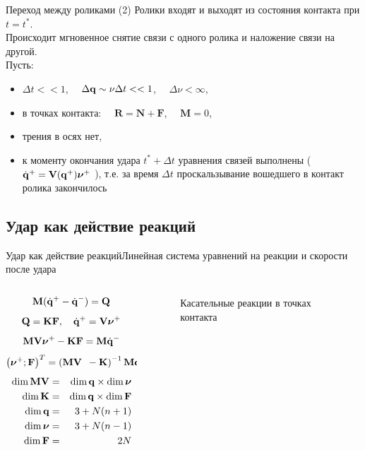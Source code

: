 \documentclass{beamer}
\begin{document}
\begin{frame}{Переход между роликами}
    \textcolor{Periwinkle}{(2) Ролики входят и выходят из состояния контакта при $t = t^*$.}\\
    Происходит мгновенное  снятие связи с одного ролика и наложение связи на другой.\\
    Пусть:
    \begin{itemize}
        \item $\Delta t << 1$, $\quad \Delta \mathbf{q} \sim \nu\Delta t << 1$, $\quad \Delta \nu < \infty$,
        \item в точках контакта: $\quad \mathbf{R} = \mathbf{N} + \mathbf{F}$, $\quad \mathbf{M} = 0 $,
        \item трения в осях нет,
        \item к моменту окончания удара $t^*+\Delta t$ уравнения связей выполнены (\enspace $\dot{\mathbf{q}}^+ = \mathbf{V}(\mathbf{q}^+)\boldsymbol{\mathbf{\nu}}^+ \ $), т.е. за время $\Delta t$ проскальзывание вошедшего в контакт ролика закончилось
    \end{itemize}
\end{frame}

\subsection{Удар как действие реакций}

\begin{frame}{Удар как действие реакций}{Линейная система уравнений на реакции и скорости после удара}
    \begin{columns}
        \hspace{15pt}
        \begin{column}{0.35\textwidth}
            \vspace{-10pt}
            $$ \mathbf{M} (\dot{\mathbf{q}}^+ - \dot{\mathbf{q}}^-) = \mathbf{Q} $$
            $$ \mathbf{Q} = \mathbf{K}\mathbf{F}, \quad \dot{\mathbf{q}}^+ = \mathbf{V}\boldsymbol{\mathbf{\nu}}^+ $$
            $$ \mathbf{M}\mathbf{V}\boldsymbol{\mathbf{\nu}}^+ - \mathbf{K}\mathbf{F} = \mathbf{M}\dot{\mathbf{q}}^- $$
            $$ \left(\boldsymbol{\mathbf{\nu}}^+ ; \mathbf{F}\right)^T = \left(\mathbf{M}\mathbf{V} \enspace -\mathbf{K}\right)^{-1} \mathbf{M}\dot{\mathbf{q}}^- $$
            \begin{eqnarray*}
                \dim \mathbf{M} \mathbf{V} & = & \dim \mathbf{q} \times \dim \boldsymbol{\mathbf{\nu}} \\
                \dim \mathbf{K} & = & \dim \mathbf{q} \times \dim \mathbf{F} \\
                \dim \mathbf{q} & = & 3 + N(n + 1) \\
                \dim \boldsymbol{\mathbf{\nu}} & = & 3 + N(n - 1) \\
                \dim \mathbf{F} & = & 2N
            \end{eqnarray*}
        \end{column}
        \hspace{55pt}
        \begin{column}{0.65\textwidth}
            \begin{figure}
                \hspace{-55pt}
                \caption{Касательные реакции в точках контакта}
            \end{figure}
        \end{column}
    \end{columns}
\end{frame}
\end{document}
